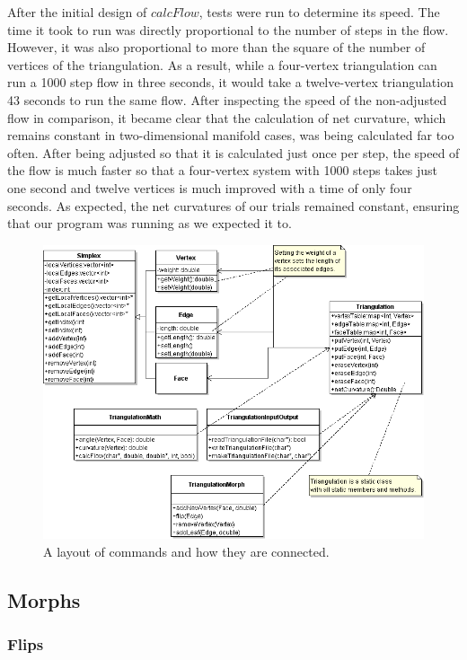 \documentclass[12pt]{article}
\begin{document}
\noindent After the initial design of $calcFlow$, tests were run to determine its speed. The time it took to run was directly proportional to the number of steps in the flow. However, it was also proportional to more than the square of the number of vertices of the triangulation. As a result, while a four-vertex triangulation can run a 1000 step flow in three seconds, it would take a twelve-vertex triangulation 43 seconds to run the same flow. After inspecting the speed of the non-adjusted flow in comparison, it became clear that the calculation of net curvature, which remains constant in two-dimensional manifold cases, was being calculated far too often. After being adjusted so that it is calculated just once per step, the speed of the flow is much faster so that a four-vertex system with 1000 steps takes just one second and twelve vertices is much improved with a time of only four seconds. As expected, the net curvatures of our trials remained constant, ensuring that our program was running as we expected it to.\newline

\begin{figure}
\includegraphics[scale = 0.5]{triangulationUML.png}
\caption{A layout of commands and how they are connected.}
\label{triUML}
\end{figure}

\subsection{Morphs}

\subsubsection{Flips}
\end{document}

